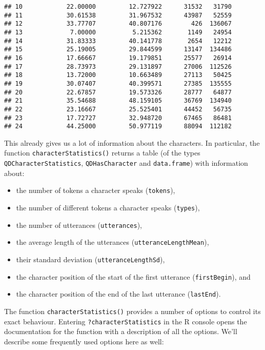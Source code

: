 \documentclass[]{book}
\providecommand{\tightlist}{%
  \setlength{\itemsep}{0pt}\setlength{\parskip}{0pt}}
\begin{document}
\begin{verbatim}
## 10            22.00000         12.727922      31532   31790
## 11            30.61538         31.967532      43987   52559
## 12            33.77707         40.807176        426  136067
## 13             7.00000          5.215362       1149   24954
## 14            31.83333         40.141778       2654   12212
## 15            25.19005         29.844599      13147  134486
## 16            17.66667         19.179851      25577   26914
## 17            28.73973         29.131897      27006  112526
## 18            13.72000         10.663489      27113   50425
## 19            30.07407         40.399571      27385  135555
## 20            22.67857         19.573326      28777   64877
## 21            35.54688         48.159105      36769  134940
## 22            23.16667         25.525401      44452   56735
## 23            17.72727         32.948720      67465   86481
## 24            44.25000         50.977119      88094  112182
\end{verbatim}

This already gives us a lot of information about the characters. In particular, the function \texttt{characterStatistics()} returns a table (of the types \texttt{QDCharacterStatistics}, \texttt{QDHasCharacter} and \texttt{data.frame}) with information about:

\begin{itemize}
\tightlist
\item
  the number of tokens a character speaks (\texttt{tokens}),
\item
  the number of different tokens a character speaks (\texttt{types}),
\item
  the number of utterances (\texttt{utterances}),
\item
  the average length of the utterances (\texttt{utteranceLengthMean}),
\item
  their standard deviation (\texttt{utteranceLengthSd}),
\item
  the character position of the start of the first utterance (\texttt{firstBegin}), and
\item
  the character position of the end of the last utterance (\texttt{lastEnd}).
\end{itemize}

The function \texttt{characterStatistics()} provides a number of options to control its exact behaviour. Entering \texttt{?characterStatistics} in the R console opens the documentation for the function with a description of all the options. We'll describe some frequently used options here as well:
\end{document}
